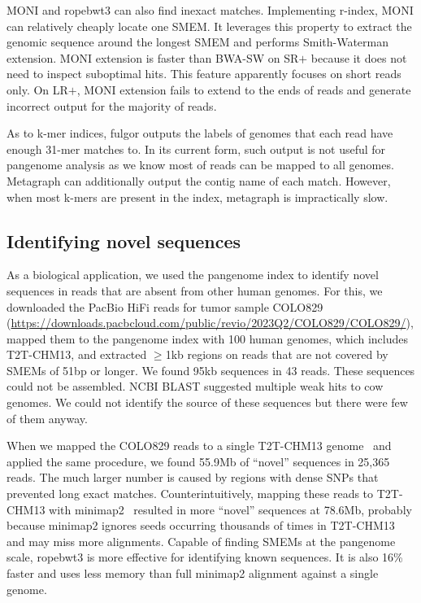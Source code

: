 \documentclass[webpdf,contemporary,large,namedate]{oup-authoring-template}%
\begin{document}
MONI and ropebwt3 can also find inexact matches.
Implementing r-index, MONI can relatively cheaply locate one SMEM.
It leverages this property to extract the genomic sequence around the longest SMEM and performs Smith-Waterman extension.
MONI extension is faster than BWA-SW on SR$+$ because it does not need to inspect suboptimal hits.
This feature apparently focuses on short reads only.
On LR$+$, MONI extension fails to extend to the ends of reads and generate incorrect output for the majority of reads.

As to k-mer indices, fulgor outputs the labels of genomes that each read have enough 31-mer matches to.
In its current form, such output is not useful for pangenome analysis as we know most of reads can be mapped to all genomes.
Metagraph can additionally output the contig name of each match.
However, when most k-mers are present in the index, metagraph is impractically slow.

\subsection{Identifying novel sequences}

As a biological application, we used the pangenome index to identify novel sequences in reads that are absent from other human genomes.
For this, we downloaded the PacBio HiFi reads for tumor sample COLO829 (\url{https://downloads.pacbcloud.com/public/revio/2023Q2/COLO829/COLO829/}),
mapped them to the pangenome index with 100 human genomes, which includes T2T-CHM13,
and extracted $\ge$1kb regions on reads that are not covered by SMEMs of 51bp or longer.
We found 95kb sequences in 43 reads.
These sequences could not be assembled.
NCBI BLAST suggested multiple weak hits to cow genomes.
We could not identify the source of these sequences but there were few of them anyway.

When we mapped the COLO829 reads to a single T2T-CHM13 genome~\citep{Nurk:2022up} and applied the same procedure,
we found 55.9Mb of ``novel'' sequences in 25,365 reads.
The much larger number is caused by regions with dense SNPs that prevented long exact matches.
Counterintuitively, mapping these reads to T2T-CHM13 with minimap2~\citep{Li:2018ab} resulted in more ``novel'' sequences at 78.6Mb,
probably because minimap2 ignores seeds occurring thousands of times in T2T-CHM13 and may miss more alignments.
Capable of finding SMEMs at the pangenome scale, ropebwt3 is more effective for identifying known sequences.
It is also 16\% faster and uses less memory than full minimap2 alignment against a single genome.
\end{document}
